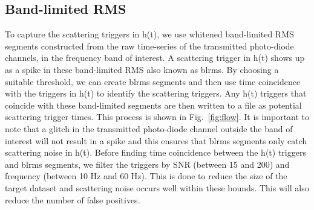 \documentclass[12pt]{iopart}
\begin{document}
\subsection{Band-limited RMS}
To capture the scattering triggers in h(t), we use whitened band-limited RMS segments constructed from the raw time-series of the transmitted photo-diode channels, in the frequency band of interest. A scattering trigger in h(t) shows up as a spike in these band-limited RMS also known as blrms. By choosing a suitable threshold, we can create blrms segments and then use time coincidence with the triggers in h(t) to identify the scattering triggers. Any h(t) triggers that coincide with these band-limited segments are then written to a file as potential scattering trigger times.  This process is shown in Fig.~\ref{fig:flow}. It is important to note that a glitch in the transmitted photo-diode channel outside the band of interest will not result in a spike and this ensures that blrms segments only catch scattering noise in h(t). Before finding time coincidence between the h(t) triggers and blrms segments, we filter the triggers by SNR (between 15 and 200) and frequency (between 10 Hz and 60 Hz). This is done to reduce the size of the target dataset and scattering noise occurs well within these bounds. This will also reduce the number of false positives. 
\end{document}
